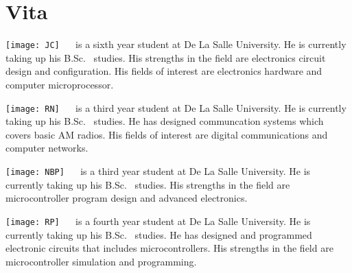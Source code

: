 \chapter{Vita}


\texttt{[image: JC]}
 \  \ is a sixth year student at De La Salle University. He is currently taking up his B.Sc. \degree \ studies. His strengths in the field are electronics circuit design and configuration. His fields of interest are electronics hardware and computer microprocessor.

\texttt{[image: RN]}
 \  \ is a third year student at De La Salle University. He is currently taking up his B.Sc. \degree \ studies. He has designed communcation systems which covers basic AM radios. His fields of interest are digital communications and computer networks.

\texttt{[image: NBP]}
 \  \ is a third year student at De La Salle University. He is currently taking up his B.Sc. \degree \ studies.  His strengths in the field are microcontroller program design and advanced electronics.

\texttt{[image: RP]}
 \  \ is a fourth year student at De La Salle University. He is currently taking up his B.Sc. \degree \ studies.  He has designed and programmed electronic circuits that includes microcontrollers. His strengths in the field are microcontroller simulation and programming.

